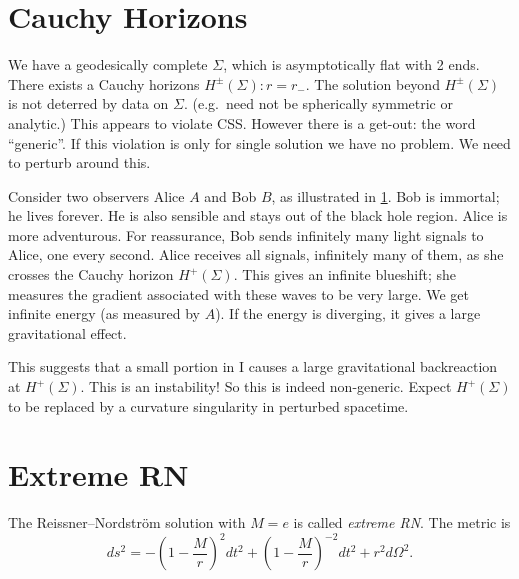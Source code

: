 
\section{Cauchy Horizons}%
\label{sec:cauchy_horizons}

We have a geodesically complete $\Sigma$, which is asymptotically flat with 2 ends.
There exists a Cauchy horizons $H^{\pm}(\Sigma): r = r_-$.
The solution beyond $H^{\pm}(\Sigma)$ is not deterred by data on $\Sigma$.
(e.g.~need not be spherically symmetric or analytic.)
This appears to violate CSS. However there is a get-out: the word ``generic''.
If this violation is only for single solution we have no problem.
We need to perturb around this.

Consider two observers Alice $A$ and Bob $B$, as illustrated in \ref{fig:l14f5}.
Bob is immortal; he lives forever. He is also sensible and stays out of the black hole region. Alice is more adventurous. For reassurance, Bob sends infinitely many light signals to Alice, one every second.
Alice receives all signals, infinitely many of them, as she crosses the Cauchy horizon $H^+(\Sigma)$.
This gives an infinite blueshift; she measures the gradient associated with these waves to be very large.
We get infinite energy (as measured by $A$).
If the energy is diverging, it gives a large gravitational effect. 
\begin{figure}[tbhp]
  \centering
  \def\svgwidth{0.4\columnwidth}
  
  \caption{}
  \label{fig:l14f5}
\end{figure}

This suggests that a small portion in I causes a large gravitational backreaction at $H^+(\Sigma)$. This is an instability! So this is indeed non-generic.
Expect $H^+(\Sigma)$ to be replaced by a curvature singularity in perturbed spacetime.

\section{Extreme RN}%
\label{sec:extreme_rn}

The Reissner--Nordström solution with $M = e$ is called \emph{extreme RN}. The metric is
\begin{equation}
  ds^2 = - \left( 1 - \frac{M}{r} \right)^2 dt^2 + \left( 1 - \frac{M}{r} \right)^{-2} dt^2 + r^2 d\Omega^2.
\end{equation}

